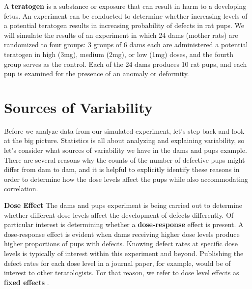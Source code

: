 \documentclass[
]{krantz}
\begin{document}
A \textbf{teratogen} is a substance or exposure that can result in harm to a developing fetus. An experiment can be conducted to determine whether increasing levels of a potential teratogen results in increasing probability of defects in rat pups. We will simulate the results of an experiment in which 24 dams (mother rats) are randomized to four groups: 3 groups of 6 dams each are administered a potential teratogen in high (3mg), medium (2mg), or low (1mg) doses, and the fourth group serves as the control. Each of the 24 dams produces 10 rat pups, and each pup is examined for the presence of an anomaly or deformity.

\hypertarget{sources-of-variability}{%
\section{Sources of Variability}\label{sources-of-variability}}

Before we analyze data from our simulated experiment, let's step back and look at the big picture. Statistics is all about analyzing and explaining variability, so let's consider what sources of variability we have in the dams and pups example. There are several reasons why the counts of the number of defective pups might differ from dam to dam, and it is helpful to explicitly identify these reasons in order to determine how the dose levels affect the pups while also accommodating correlation.

\textbf{Dose Effect} The dams and pups experiment is being carried out to determine whether different dose levels affect the development of defects differently. Of particular interest is determining whether a \textbf{dose-response}  effect is present. A dose-response effect is evident when dams receiving higher dose levels produce higher proportions of pups with defects. Knowing defect rates at specific dose levels is typically of interest within this experiment and beyond. Publishing the defect rates for each dose level in a journal paper, for example, would be of interest to other teratologists. For that reason, we refer to dose level effects as \textbf{fixed effects} .
\end{document}
